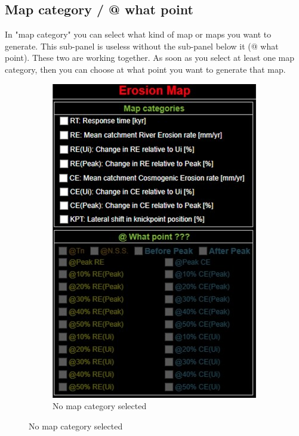 \documentclass[11pt,a4paper,titlepage]{report}
\begin{document}
\subsection{Map category / @ what point}
In "map category" you can select what kind of map or maps you want to generate. This sub-panel is useless without the sub-panel below it (@ what point). These two are working together. As soon as you select at least one map category, then you can choose at what point you want to generate that map.

\begin{figure}[H]
    \centering
    \begin{subfigure}[H]{0.3\textwidth}
        \includegraphics[width=\textwidth]{mcwp1.jpg}
        \caption{No map category selected}

\end{subfigure}
\end{figure}
\end{document}
